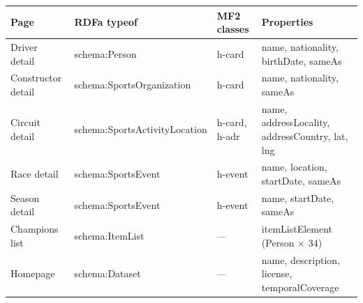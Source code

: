 \begin{center}
\begin{tabularx}{\linewidth}{@{}lllX@{}}
\toprule
\textbf{Page} & \textbf{RDFa typeof} & \textbf{MF2 classes} & \textbf{Properties} \\
\midrule
Driver detail      & schema:Person                 & h-card        & name, nationality, birthDate, sameAs \\
Constructor detail & schema:SportsOrganization     & h-card        & name, nationality, sameAs \\
Circuit detail     & schema:SportsActivityLocation & h-card, h-adr & name, addressLocality, addressCountry, lat, lng \\
Race detail        & schema:SportsEvent            & h-event       & name, location, startDate, sameAs \\
Season detail      & schema:SportsEvent            & h-event       & name, startDate, sameAs \\
Champions list     & schema:ItemList               & ---           & itemListElement (Person $\times$ 34) \\
Homepage           & schema:Dataset                & ---           & name, description, license, temporalCoverage \\
\bottomrule
\end{tabularx}
\end{center}
